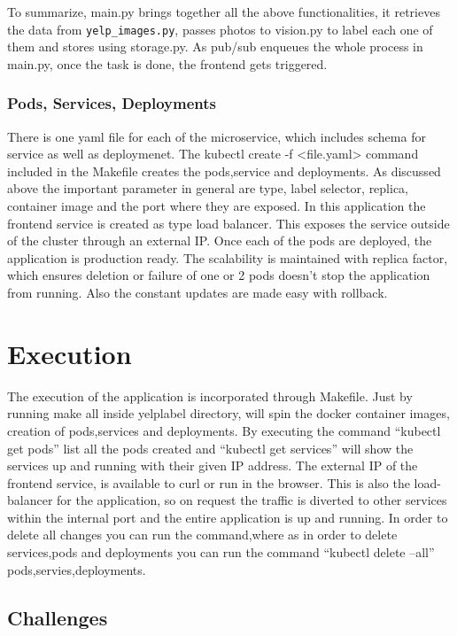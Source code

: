 To summarize, main.py brings together all the above functionalities,
it retrieves the data from \verb|yelp_images.py|, passes photos to
vision.py to label each one of them and stores using storage.py. As
pub/sub enqueues the whole process in main.py, once the task is done,
the frontend gets triggered.
  
\subsubsection{Pods, Services, Deployments} 

There is one yaml file for each of the microservice, which includes
schema for service as well as deploymenet. The
kubectl create -f <file.yaml> command included in the Makefile
creates the pods,service and deployments. As discussed above the
important parameter in general are type, label selector, replica,
container image and the port where they are exposed.  In this
application the frontend service is created as type load
balancer. This exposes the service outside of the cluster through an
external IP. Once each of the pods are deployed, the application is
production ready. The scalability is maintained with replica factor,
which ensures deletion or failure of one or 2 pods doesn’t stop the
application from running. Also the constant updates are made easy with
rollback.
  
\section{Execution}

The execution of the application is incorporated through
Makefile. Just by running make all inside yelplabel directory, will
spin the docker container images, creation of pods,services and
deployments. By executing the command ``kubectl get pods'' list all
the pods created and ``kubectl get services'' will show the services
up and running with their given IP address. The external IP of the
frontend service, is available to curl or run in the browser. This is
also the load-balancer for the application, so on request the traffic
is diverted to other services within the internal port and the entire
application is up and running. In order to delete all changes you can
run the command,where as in order to delete services,pods and
deployments you can run the command ``kubectl delete --all''
pods,servies,deployments.
  
\subsection{Challenges}

